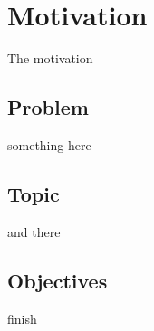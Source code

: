 \chapter{Motivation} \label{motivation}
The motivation

\section{Problem}
something here

\section{Topic}
and there

\section{Objectives}
finish